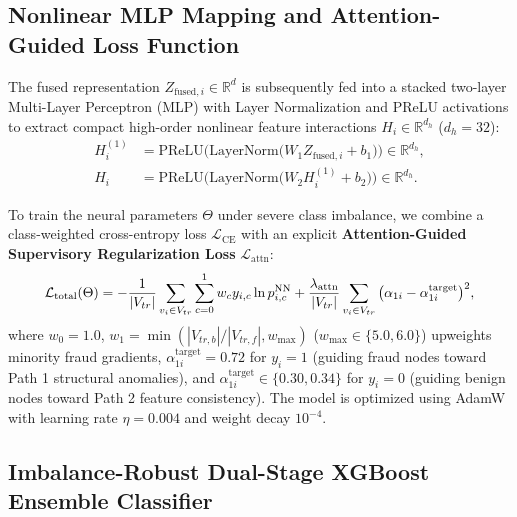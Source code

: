 \documentclass[10pt,a4paper,twocolumn]{article}
\begin{document}
\subsection{Nonlinear MLP Mapping and Attention-Guided Loss Function}

The fused representation $Z_{\text{fused},i} \in \mathbb{R}^d$ is subsequently fed into a stacked two-layer Multi-Layer Perceptron (MLP) with Layer Normalization and PReLU activations to extract compact high-order nonlinear feature interactions $H_i \in \mathbb{R}^{d_h}$ ($d_h = 32$):
\begin{align}
  H_i^{(1)} &= \text{PReLU}\Big(\text{LayerNorm}\big(W_1 Z_{\text{fused},i} + b_1\big)\Big) \in \mathbb{R}^{d_h}, \\
  H_i &= \text{PReLU}\Big(\text{LayerNorm}\big(W_2 H_i^{(1)} + b_2\big)\Big) \in \mathbb{R}^{d_h}.
\end{align}

To train the neural parameters $\Theta$ under severe class imbalance, we combine a class-weighted cross-entropy loss $\mathcal{L}_{\text{CE}}$ with an explicit \textbf{Attention-Guided Supervisory Regularization Loss} $\mathcal{L}_{\text{attn}}$:
\begin{equation}
  \resizebox{0.89\linewidth}{!}{$\displaystyle \mathcal{L}_{\text{total}}(\Theta) = -\frac{1}{|V_{tr}|} \sum_{v_i \in V_{tr}} \sum_{c=0}^1 w_c y_{i,c} \ln p_{i,c}^{\text{NN}} + \frac{\lambda_{\text{attn}}}{|V_{tr}|} \sum_{v_i \in V_{tr}} \big(\alpha_{1i} - \alpha_{1i}^{\text{target}}\big)^2,$}
\end{equation}
where $w_0 = 1.0$, $w_1 = \min(|V_{tr,b}|/|V_{tr,f}|, w_{\max})$ ($w_{\max} \in \{5.0, 6.0\}$) upweights minority fraud gradients, $\alpha_{1i}^{\text{target}} = 0.72$ for $y_i = 1$ (guiding fraud nodes toward Path 1 structural anomalies), and $\alpha_{1i}^{\text{target}} \in \{0.30, 0.34\}$ for $y_i = 0$ (guiding benign nodes toward Path 2 feature consistency). The model is optimized using AdamW \cite{ref60} with learning rate $\eta = 0.004$ and weight decay $10^{-4}$.

\subsection{Imbalance-Robust Dual-Stage XGBoost Ensemble Classifier}
\end{document}
